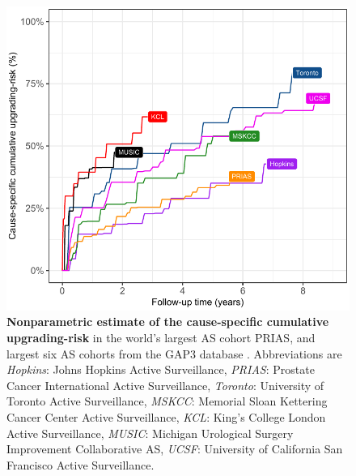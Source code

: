 \begin{subappendices}
\begin{figure}
\centerline{\includegraphics{contents/c5/images/c5_fig_app1.pdf}}
\caption{\textbf{Nonparametric estimate \citep{turnbull1976empirical} of the cause-specific cumulative upgrading-risk} in the world's largest AS cohort PRIAS, and largest six AS cohorts from the GAP3 database \citep{gap3_2018}. Abbreviations are \textit{Hopkins}: Johns Hopkins Active Surveillance, \textit{PRIAS}: Prostate Cancer International Active Surveillance, \textit{Toronto}: University of Toronto Active Surveillance, \textit{MSKCC}: Memorial Sloan Kettering Cancer Center Active Surveillance, \textit{KCL}: King's College London Active Surveillance, \textit{MUSIC}: Michigan Urological Surgery Improvement Collaborative AS, \textit{UCSF}: University of California San Francisco Active Surveillance.}
\label{c5:fig:app1}
\end{figure}


\end{subappendices}
